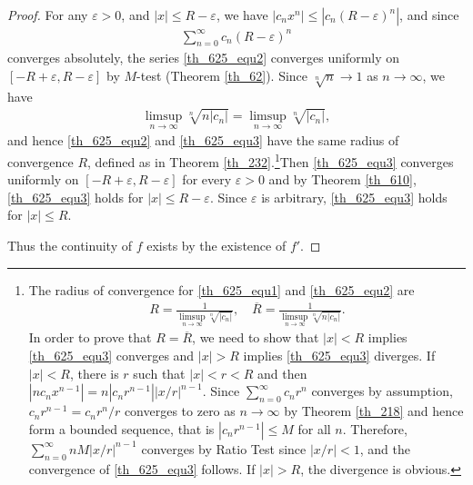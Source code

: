 \documentclass[10pt]{book}
\theoremstyle{definition}
\numberwithin{equation}{chapter}
\begin{document}
\begin{proof}
For any $\varepsilon > 0$, and $\left|x\right| \leq R - \varepsilon$, we have $\left|c_nx^n\right| \leq \left|c_n(R - \varepsilon)^n\right|$, and since
\begin{align*}
    \sum^\infty_{n=0} c_n(R - \varepsilon)^n
\end{align*}
converges absolutely, the series \eqref{th_625_equ2} converges uniformly on $[-R + \varepsilon, R - \varepsilon]$ by $M$-test (Theorem \ref{th_62}). Since $\sqrt[n]{n} \to 1$ as $n \to \infty$, we have
\begin{align*}
    \limsup_{n\to\infty} \sqrt[n]{n\left|c_n\right|} = \limsup_{n\to\infty} \sqrt[n]{\left|c_n\right|},
\end{align*}
and hence \eqref{th_625_equ2} and \eqref{th_625_equ3} have the same radius of convergence $R$, defined as in Theorem \ref{th_232}.\footnote{The radius of convergence for \eqref{th_625_equ1} and \eqref{th_625_equ2} are
\begin{align*}
    R = \frac{1}{\limsup_{n\to\infty} \sqrt[n]{\left|c_n\right|}}, \quad \overline{R} = \frac{1}{\limsup_{n\to\infty} \sqrt[n]{n\left|c_n\right|}}.
\end{align*}
In order to prove that $R = \overline{R}$, we need to show that $\left|x\right| < R$ implies \eqref{th_625_equ3} converges and $\left|x\right| > R$ implies \eqref{th_625_equ3} diverges. If $\left|x\right| < R$, there is $r$ such that $\left|x\right| < r < R$ and then $\left|n c_n x^{n-1}\right| = n \left|c_n r^{n-1}\right| \left|x/r\right|^{n-1}$. Since $\sum^\infty_{n=0} c_n r^n$ converges by assumption, $c_n r^{n-1} = c_nr^n/r$ converges to zero as $n \to \infty$ by Theorem \ref{th_218} and hence form a bounded sequence, that is $\left|c_n r^{n-1}\right| \leq M$ for all $n$. Therefore, $\sum^\infty_{n=0} nM \left|x/r\right|^{n-1}$ converges by Ratio Test since $\left|x/r\right| < 1$, and the convergence of \eqref{th_625_equ3} follows. If $\left|x\right| > R$, the divergence is obvious.}Then \eqref{th_625_equ3} converges uniformly on $[-R + \varepsilon, R - \varepsilon]$ for every $\varepsilon > 0$ and by Theorem \ref{th_610}, \eqref{th_625_equ3} holds for $\left|x\right| \leq R - \varepsilon$. Since $\varepsilon$ is arbitrary, \eqref{th_625_equ3} holds for $\left|x\right| \leq R$. 

Thus the continuity of $f$ exists by the existence of $f'$.
\end{proof}

\medskip
\end{document}
